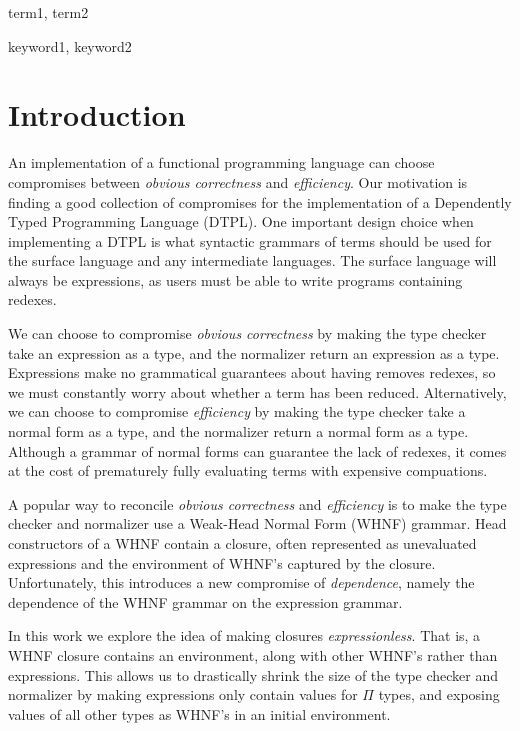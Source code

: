 \documentclass[preprint,authoryear]{sigplanconf}
\begin{document}

\terms
term1, term2

\keywords
keyword1, keyword2

\section{Introduction}

An implementation of a functional programming language can choose
compromises between {\it obvious correctness} and {\it efficiency}. Our motivation is
finding a good collection of compromises for the
implementation of a Dependently Typed Programming Language (DTPL).
One important design choice when implementing a DTPL is what syntactic
grammars of terms should be used for the surface language and any
intermediate languages. The surface language will always be
expressions, as users must be able to write programs containing
redexes.

We can choose to compromise {\it obvious correctness} by making
the type checker take an expression as a type,
and the normalizer return an expression as a type. Expressions
make no grammatical guarantees about having removes redexes, so we
must constantly worry about whether a term has been reduced.
Alternatively, we can choose to compromise {\it efficiency} by making
the type checker take a normal form as a type, and the normalizer
return a normal form as a type. Although a grammar of normal forms can
guarantee the lack of redexes, it comes at the cost of prematurely
fully evaluating terms with expensive compuations.

A popular way to reconcile
{\it obvious correctness} and {\it efficiency} is to make
the type checker and normalizer use a
Weak-Head Normal Form (WHNF) grammar. Head constructors of a WHNF
contain a closure, often represented as unevaluated expressions and the
environment of WHNF's captured by the closure. Unfortunately, this
introduces a new compromise of {\it dependence}, namely the dependence
of the WHNF grammar on the expression grammar.

In this work we explore the idea of making closures
{\it expressionless}. That is, a WHNF closure contains an environment,
along with other WHNF's rather than expressions. This allows us to
drastically shrink the size of the type checker and normalizer by
making expressions only contain values for $\Pi$ types, and exposing
values of all other types as WHNF's in an initial environment.
\end{document}
